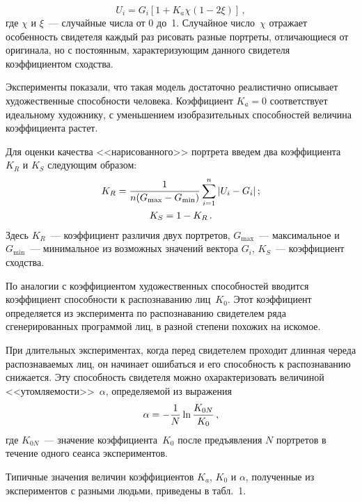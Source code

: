\begin{multicols}{2}
\noindent
     \begin{equation}
     U_i = G_i\left[1+K_a \chi \left(1-2\xi\right)\right]\,,
     \label{e1pr}
     \end{equation}
     где $\chi$ и $\xi$~--- случайные числа от 0 до~1. Случайное число~$\chi$ 
отражает особенность свидетеля каждый раз рисовать разные портреты, 
отличающиеся от оригинала, но с постоянным, характеризующим данного 
свидетеля коэффициентом сходства. 
     
     Эксперименты показали, что такая модель достаточно реалистично 
описывает художественные способности человека. Коэффициент $K_a=0$ 
соответствует идеальному художнику, с уменьшением изобразительных 
способностей величина коэффициента растет. 
     
     Для оценки качества <<нарисованного>> портрета введем два 
коэффициента~$K_R$ и $K_S$ следующим образом:
     \begin{gather}
     K_R = \displaystyle\frac{\displaystyle 1\mathstrut}{\displaystyle n(G_{\max}-G_{\min})\mathstrut}\sum\limits_{i=1}^n\vert U_i-
G_i\vert\,; \label{e2pr}\\
     K_S=1-K_R\,.\label{e3pr}
     \end{gather}
     Здесь $K_R$~--- коэффициент различия двух портретов, $G_{\max}$~--- 
максимальное и $G_{\min}$~--- минимальное из возможных значений вектора 
$G_i$, $K_S$~--- коэффициент сходства.
     
     По аналогии с коэффициентом художественных способностей вводится 
коэффициент способности к распознаванию лиц~$K_0$. Этот коэффициент 
определяется из эксперимента по распознаванию свидетелем ряда 
сгенерированных программой лиц, в разной степени похожих на искомое. 
     
     При длительных экспериментах, когда перед свидетелем проходит 
длинная череда рас\-по\-зна\-ва\-емых лиц, он начинает ошибаться и его способность 
к распознаванию снижается. Эту способность свидетеля можно 
охарактеризовать величиной <<утомляемости>>~$\alpha$, определяемой из 
выражения
     \begin{equation}
     \alpha = -\displaystyle\frac{\displaystyle 1\mathstrut}{\displaystyle N\mathstrut}\ln\displaystyle\frac{\displaystyle K_{0N}\mathstrut}{\displaystyle K_0\mathstrut}\,,
     \label{e5pr}
     \end{equation}
     где $K_{0N}$~--- значение коэффициента~$K_0$ после предъявления 
$N$ портретов в течение одного сеанса экспериментов. 

Типичные значения величин коэффициентов  $K_a$, $K_0$ и $\alpha$, 
полученные из  экспериментов с разными людьми, приведены в 
табл.~1. 

\bigskip


\end{multicols}
